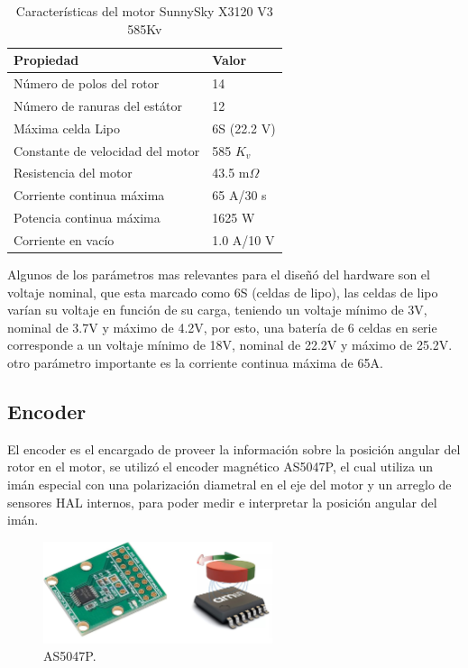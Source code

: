 \documentclass[11pt]{report}
\begin{document}
\begin{table}[h!]
	\centering
	\caption{Características del motor SunnySky X3120 V3 585Kv}
	\begin{tabular}{l l}
		\hline
		\textbf{Propiedad}               & \textbf{Valor} \\
		\hline
		Número de polos del rotor        & 14             \\
		Número de ranuras del estátor    & 12             \\
		Máxima celda Lipo                & 6S (22.2 V)    \\
		Constante de velocidad del motor & 585 $K_v$      \\
		Resistencia del motor            & 43.5 m$\Omega$ \\
		Corriente continua máxima        & 65 A/30 s      \\
		Potencia continua máxima         & 1625 W         \\
		Corriente en vacío               & 1.0 A/10 V     \\
		\hline
	\end{tabular}
\end{table}
\FloatBarrier

Algunos de los parámetros mas relevantes para el diseñó del hardware son el voltaje nominal, que esta marcado como 6S (celdas de lipo), las celdas de lipo varían su voltaje en función de su carga, teniendo un voltaje mínimo de 3V, nominal de 3.7V y máximo de 4.2V, por esto, una batería de 6 celdas en serie corresponde a un voltaje mínimo de 18V, nominal de 22.2V y máximo de 25.2V. otro parámetro importante es la corriente continua máxima de 65A.

\newpage
\subsection{Encoder}

El encoder es el encargado de proveer la información sobre la posición angular del rotor en el motor, se utilizó el encoder magnético AS5047P, el cual utiliza un imán especial con una polarización diametral en el eje del motor y un arreglo de sensores HAL internos, para poder medir e interpretar la posición angular del imán.

\begin{figure}[ht]
	\centering
	\includegraphics[width=0.6\textwidth]{imagenes/Motor/AS5047P.jpg}
	\caption{AS5047P.}
	\label{AS5047P}
\end{figure}
\FloatBarrier
\end{document}
